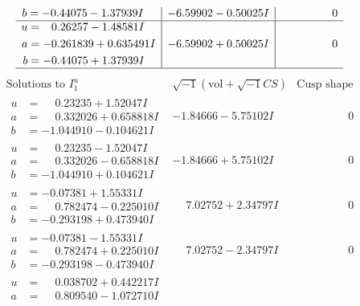 \documentclass[1p]{elsarticle_modified}
\theoremstyle{definition}
\newcommand{\I}{\sqrt{-1}}
\begin{document}
$$\begin{array}{c|c|c}
\begin{aligned}
b &= -0.44075 - 1.37939 I\end{aligned}
 & -6.59902 - 0.50025 I & \phantom{-0.000000 } 0 \\ \hline\begin{aligned}
u &= \phantom{-}0.26257 - 1.48581 I \\
a &= -0.261839 + 0.635491 I \\
b &= -0.44075 + 1.37939 I\end{aligned}
 & -6.59902 + 0.50025 I & \phantom{-0.000000 } 0\\
 \hline 
 \end{array}$$\newpage$$\begin{array}{c|c|c}  
\text{Solutions to }I^u_{1}& \I (\text{vol} + \sqrt{-1}CS) & \text{Cusp shape}\\
 \hline 
\begin{aligned}
u &= \phantom{-}0.23235 + 1.52047 I \\
a &= \phantom{-}0.332026 + 0.658818 I \\
b &= -1.044910 - 0.104621 I\end{aligned}
 & -1.84666 - 5.75102 I & \phantom{-0.000000 } 0 \\ \hline\begin{aligned}
u &= \phantom{-}0.23235 - 1.52047 I \\
a &= \phantom{-}0.332026 - 0.658818 I \\
b &= -1.044910 + 0.104621 I\end{aligned}
 & -1.84666 + 5.75102 I & \phantom{-0.000000 } 0 \\ \hline\begin{aligned}
u &= -0.07381 + 1.55331 I \\
a &= \phantom{-}0.782474 - 0.225010 I \\
b &= -0.293198 + 0.473940 I\end{aligned}
 & \phantom{-}7.02752 + 2.34797 I & \phantom{-0.000000 } 0 \\ \hline\begin{aligned}
u &= -0.07381 - 1.55331 I \\
a &= \phantom{-}0.782474 + 0.225010 I \\
b &= -0.293198 - 0.473940 I\end{aligned}
 & \phantom{-}7.02752 - 2.34797 I & \phantom{-0.000000 } 0 \\ \hline\begin{aligned}
u &= \phantom{-}0.038702 + 0.442217 I \\
a &= \phantom{-}0.809540 - 1.072710 I \\

\end{aligned}
\end{array}$$
\end{document}
